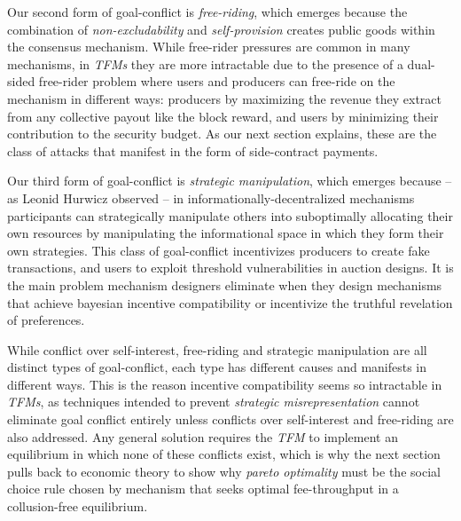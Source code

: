 Our second form of goal-conflict is \textit{free-riding}, which emerges because the combination of \textit{non-excludability} and \textit{self-provision} creates public goods within the consensus mechanism. While free-rider pressures are common in many mechanisms, in \textit{TFMs} they are more intractable due to the presence of a dual-sided free-rider problem where users and producers can free-ride on the mechanism in different ways: producers by maximizing the revenue they extract from any collective payout like the block reward, and users by minimizing their contribution to the security budget. As our next section explains, these are the class of attacks that manifest in the form of side-contract payments.

Our third form of goal-conflict is \textit{strategic manipulation}, which emerges because -- as Leonid Hurwicz observed -- in informationally-decentralized mechanisms participants can strategically manipulate others into suboptimally allocating their own resources by manipulating the informational space in which they form their own strategies. This class of goal-conflict incentivizes producers to create fake transactions, and users to exploit threshold vulnerabilities in auction designs. It is the main problem mechanism designers eliminate when they design mechanisms that achieve bayesian incentive compatibility or incentivize the truthful revelation of preferences.

While conflict over self-interest, free-riding and strategic manipulation are all distinct types of goal-conflict, each type has different causes and manifests in different ways. This is the reason incentive compatibility seems so intractable in \textit{TFMs}, as techniques intended to prevent \textit{strategic misrepresentation} cannot eliminate goal conflict entirely unless conflicts over self-interest and free-riding are also addressed. Any general solution requires the \textit{TFM} to implement an equilibrium in which none of these conflicts exist, which is why the next section pulls back to economic theory to show why \textit{pareto optimality} must be the social choice rule chosen by mechanism that seeks optimal fee-throughput in a collusion-free equilibrium.

